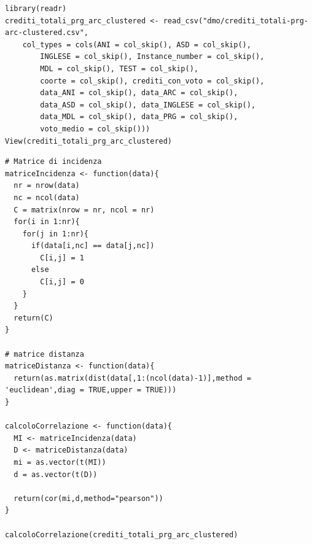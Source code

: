 \documentclass[12pt]{article}
\begin{document}
\lstset{%
   breaklines=true
}

\begin{lstlisting}[caption={Importazione degli attributi crediti totali, architetture, programmazione e cluster.}, label={datacluster}, captionpos=b, style = R]
library(readr)
crediti_totali_prg_arc_clustered <- read_csv("dmo/crediti_totali-prg-arc-clustered.csv", 
    col_types = cols(ANI = col_skip(), ASD = col_skip(), 
        INGLESE = col_skip(), Instance_number = col_skip(), 
        MDL = col_skip(), TEST = col_skip(), 
        coorte = col_skip(), crediti_con_voto = col_skip(), 
        data_ANI = col_skip(), data_ARC = col_skip(), 
        data_ASD = col_skip(), data_INGLESE = col_skip(), 
        data_MDL = col_skip(), data_PRG = col_skip(), 
        voto_medio = col_skip()))
View(crediti_totali_prg_arc_clustered)
\end{lstlisting}

\begin{lstlisting}[caption={Calcolo Matrice di incidenza dei cluster, delle distanze e correlazione tra le due matrici.}, label={matrix-cor1}, captionpos=b, style = R]
# Matrice di incidenza
matriceIncidenza <- function(data){
  nr = nrow(data)
  nc = ncol(data)
  C = matrix(nrow = nr, ncol = nr)
  for(i in 1:nr){
	for(j in 1:nr){
	  if(data[i,nc] == data[j,nc])
		C[i,j] = 1
	  else
		C[i,j] = 0
	}
  }
  return(C)
}

# matrice distanza
matriceDistanza <- function(data){
  return(as.matrix(dist(data[,1:(ncol(data)-1)],method = 'euclidean',diag = TRUE,upper = TRUE)))
}

calcoloCorrelazione <- function(data){
  MI <- matriceIncidenza(data)
  D <- matriceDistanza(data)
  mi = as.vector(t(MI))
  d = as.vector(t(D))
  
  return(cor(mi,d,method="pearson"))
}

calcoloCorrelazione(crediti_totali_prg_arc_clustered)
\end{lstlisting}	
\end{document}

